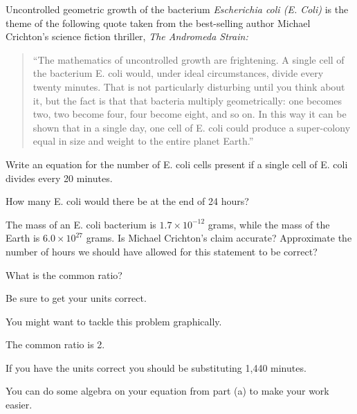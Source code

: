 \begin{activity}\label{A:0.2.3}%
    Uncontrolled geometric growth of the bacterium {\it Escherichia coli (E. Coli)} is the
    theme of the following quote taken from the best-selling author Michael Crichton's
    science fiction thriller, {\it The Andromeda Strain:}
    \begin{quote}
        ``The mathematics of uncontrolled growth are frightening.  A single cell of the
        bacterium E. coli would, under ideal circumstances, divide every twenty minutes.
        That is not particularly disturbing until you think about it, but the fact is that
        that bacteria multiply geometrically: one becomes two, two become four, four
        become eight, and so on.  In this way it can be shown that in a single day, one
        cell of E. coli could produce a super-colony equal in size and weight to the
        entire planet Earth.''
    \end{quote}
    \ba
        \item Write an equation for the number of E. coli cells present if a single cell
            of E. coli divides every 20 minutes. 
        \item How many E. coli would there be at the end of 24 hours?
        \item The mass of an E. coli bacterium is $1.7 \times 10^{-12}$ grams, while the
            mass of the Earth is $6.0 \times 10^{27}$ grams.  Is Michael Crichton's claim
            accurate?  Approximate the number of hours we should have allowed for this
            statement to be correct?
    \ea
\end{activity}
\begin{smallhint}
   \ba
    \item What is the common ratio?
    \item Be sure to get your units correct.
    \item You might want to tackle this problem graphically.
   \ea
\end{smallhint}
\begin{bighint}
   \ba
    \item The common ratio is 2.
    \item If you have the units correct you should be substituting 1,440 minutes.
    \item You can do some algebra on your equation from part (a) to make your work easier.
   \ea
\end{bighint}
